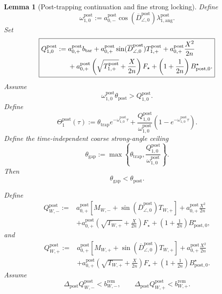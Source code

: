 \documentclass{article} %
\theoremstyle{plain}
\newtheorem{lemma}[theorem]{Lemma}
\theoremstyle{definition}
\theoremstyle{remark}
\begin{document}
\begin{lemma}[Post-trapping continuation and fine strong locking]
Define
\[
\boxed{
\omega_{1,0}^{\mathrm{post}}
:=
a_{0,-}^{\mathrm{post}}
\cos(\overline D_{\angle,0}^{\mathrm{post}})
\lambda_{1,\mathrm{ang}}^{\mathrm{post}}.
}
\]
Set
\[
\boxed{
\begin{aligned}
Q_{1,0}^{\mathrm{post}}
:={}&
a_{0,+}^{\mathrm{post}}b_{\rm tar}
+a_{0,+}^{\mathrm{post}}
\sin(\overline D_{\angle,0}^{\mathrm{post}})T_{1,+}^{\mathrm{post}}
+
a_{0,+}^{\mathrm{post}}\frac{X^2}{2n}
\\
&+
a_{0,+}^{\mathrm{post}}
\left(\sqrt{T_{1,+}^{\mathrm{post}}}+\frac{X}{2n}\right)F_\star
+
\left(1+\frac1{2n}\right)B_{\mathrm{post},0}^\star.
\end{aligned}
}
\]
Assume
\[
\boxed{
\omega_{1,0}^{\mathrm{post}}\theta_{\mathrm{post}}
>
Q_{1,0}^{\mathrm{post}}.
}
\]
Define
\[
\boxed{
\Theta_1^{\mathrm{post}}(\tau)
:=
\theta_{\mathrm{trap}}e^{-\omega_{1,0}^{\mathrm{post}}\tau}
+
\frac{Q_{1,0}^{\mathrm{post}}}{\omega_{1,0}^{\mathrm{post}}}
\left(1-e^{-\omega_{1,0}^{\mathrm{post}}\tau}\right).
}
\]
Define the time-independent coarse strong-angle ceiling
\[
\boxed{
\theta_{\mathrm{gap}}
:=
\max\left\{
\theta_{\mathrm{trap}},
\frac{Q_{1,0}^{\mathrm{post}}}{\omega_{1,0}^{\mathrm{post}}}
\right\}.
}
\]
Then
\[
\boxed{\theta_{\mathrm{gap}}<\theta_{\mathrm{post}}.}
\]


Define
\[
\boxed{
\begin{aligned}
Q_{W,-}^{\mathrm{post}}
:={}&
a_{0,+}^{\mathrm{post}}
\left[M_{W,-}+\sin(\overline D_{\angle,0}^{\mathrm{post}})T_{W,+}\right]
+
a_{0,+}^{\mathrm{post}}\frac{X^2}{2n}
\\
&+
a_{0,+}^{\mathrm{post}}
\left(\sqrt{T_{W,+}}+\frac{X}{2n}\right)F_\star
+
\left(1+\frac1{2n}\right)B_{\mathrm{post},0}^\star,
\end{aligned}
}
\]
and
\[
\boxed{
\begin{aligned}
Q_{W,+}^{\mathrm{post}}
:={}&
a_{0,+}^{\mathrm{post}}
\left[M_{W,+}+\sin(\overline D_{\angle,0}^{\mathrm{post}})T_{W,+}\right]
+
a_{0,+}^{\mathrm{post}}\frac{X^2}{2n}
\\
&+
a_{0,+}^{\mathrm{post}}
\left(\sqrt{T_{W,+}}+\frac{X}{2n}\right)F_\star
+
\left(1+\frac1{2n}\right)B_{\mathrm{post},0}^\star.
\end{aligned}
}
\]
Assume
\[
\boxed{
\Delta_{\mathrm{post}}Q_{W,-}^{\mathrm{post}}<b_{W,-}^{\mathrm{rem}},
\qquad
\Delta_{\mathrm{post}}Q_{W,+}^{\mathrm{post}}<b_{W,+}^{\mathrm{rem}}.
}
\]


\end{lemma}
\end{document}
